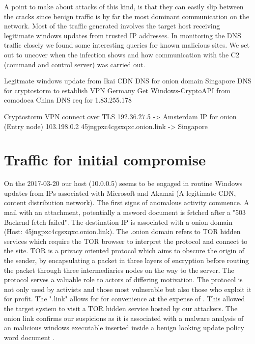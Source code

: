 \documentclass[11pt]{diazessay} %
\begin{document}
A point to make about attacks of this kind, is that they can easily slip between the cracks since benign traffic is by far the most dominant communication on the network. Most of the traffic generated involves the target host receiving legitimate windows updates from trusted IP addresses. In monitoring the DNS traffic closely we found some interesting queries for known malicious sites. We set out to uncover when the infection shows and how communication with the C2 (command and control server) was carried out.

Legitmate windows update from Ikai CDN 
DNS for onion domain Singapore 
DNS for cryptostorm to establish VPN Germany
Get Windows-CryptoAPI from comodoca 
China DNS req  for 1.83.255.178 

Cryptostorm VPN connect over TLS 
192.36.27.5 -> Amsterdam IP for onion (Entry node)
103.198.0.2     45jngpxc4cgsxqxc.onion.link -> Singapore


\section{Traffic for initial compromise}

On the 2017-03-20 our host (10.0.0.5) seems to be engaged in routine Windows updates from IPs associated with Microsoft and Akamai (A legitimate CDN, content distribution network). The first signs of anomalous activity commence. A mail with an attachment, potentially a msword document is fetched after a "503 Backend fetch failed". The destination IP is associated with a onion domain (Host: 45jngpxc4cgsxqxc.onion.link). The .onion domain refers to TOR hidden services which require the TOR browser to interpret the protocol and connect to the site. TOR is a privacy oriented protocol which aims to obscure the origin of the sender, by encapsulating a packet in three layers of encryption before routing the packet through three intermediaries nodes on the way to the server. The protocol serves a valuable role to actors of differing motivation. The protocol is not only used by activists and those most vulnerable but also those who exploit it for profit. The ".link" allows for for convenience at the expense of \cite{onionlink}. This allowed the target system to visit a TOR hidden service hosted by our attackers. The onion link confirms our suspicions as it is associated with a malware analysis of an malicious windows executable inserted inside a benign looking update policy word document \cite{hybrid}.
\end{document}
